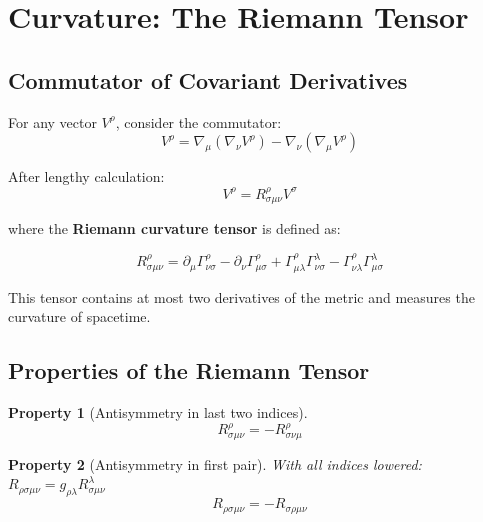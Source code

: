 \documentclass[11pt,a4paper]{article}
\newtheorem{property}{Property}
\begin{document}
\section{Curvature: The Riemann Tensor}

\subsection{Commutator of Covariant Derivatives}

For any vector $V^\rho$, consider the commutator:
\begin{equation}
[\nabla_\mu, \nabla_\nu] V^\rho = \nabla_\mu (\nabla_\nu V^\rho) - \nabla_\nu (\nabla_\mu V^\rho)
\end{equation}

After lengthy calculation:
\begin{equation}
[\nabla_\mu, \nabla_\nu] V^\rho = R^\rho_{\sigma\mu\nu} V^\sigma
\end{equation}

where the \textbf{Riemann curvature tensor} is defined as:

\begin{equation}
\boxed{R^\rho_{\sigma\mu\nu} = \partial_\mu \Gamma^\rho_{\nu\sigma} - \partial_\nu \Gamma^\rho_{\mu\sigma} + \Gamma^\rho_{\mu\lambda} \Gamma^\lambda_{\nu\sigma} - \Gamma^\rho_{\nu\lambda} \Gamma^\lambda_{\mu\sigma}}
\end{equation}

This tensor contains at most two derivatives of the metric and measures the curvature of spacetime.

\subsection{Properties of the Riemann Tensor}

\begin{property}[Antisymmetry in last two indices]
\begin{equation}
R^\rho_{\sigma\mu\nu} = -R^\rho_{\sigma\nu\mu}
\end{equation}
\end{property}

\begin{property}[Antisymmetry in first pair]
With all indices lowered: $R_{\rho\sigma\mu\nu} = g_{\rho\lambda} R^\lambda_{\sigma\mu\nu}$
\begin{equation}
R_{\rho\sigma\mu\nu} = -R_{\sigma\rho\mu\nu}
\end{equation}
\end{property}
\end{document}
